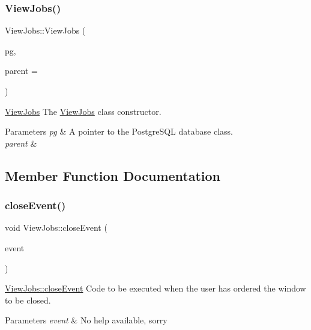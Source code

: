 \subsubsection{\texorpdfstring{View\+Jobs()}{ViewJobs()}}
{\footnotesize\ttfamily View\+Jobs\+::\+View\+Jobs (\begin{DoxyParamCaption}\item[{\hyperlink{classpsql}{psql} $\ast$}]{pg,  }\item[{Q\+Widget $\ast$}]{parent = {} }\end{DoxyParamCaption})\hspace{0.3cm}{\ttfamily [explicit]}}



\hyperlink{class_view_jobs}{View\+Jobs} The \hyperlink{class_view_jobs}{View\+Jobs} class constructor. 


\begin{DoxyParams}{Parameters}
{\em pg} & A pointer to the Postgre\+S\+QL database class. \\
\hline
{\em parent} & \\
\hline
\end{DoxyParams}


\subsection{Member Function Documentation}
\mbox{\label{class_view_jobs_a832503ca9eb4e4bf79c2fb48a59141aa}} 
\subsubsection{\texorpdfstring{close\+Event()}{closeEvent()}}
{\footnotesize\ttfamily void View\+Jobs\+::close\+Event (\begin{DoxyParamCaption}\item[{Q\+Close\+Event $\ast$}]{event }\end{DoxyParamCaption})\hspace{0.3cm}{\ttfamily [override]}}



\hyperlink{class_view_jobs_a832503ca9eb4e4bf79c2fb48a59141aa}{View\+Jobs\+::close\+Event} Code to be executed when the user has ordered the window to be closed. 


\begin{DoxyParams}{Parameters}
{\em event} & No help available, sorry \\
\hline
\end{DoxyParams}
\mbox{\label{class_view_jobs_ae9c1c806aa1dd5082b38a1dc9cbec39e}} 
